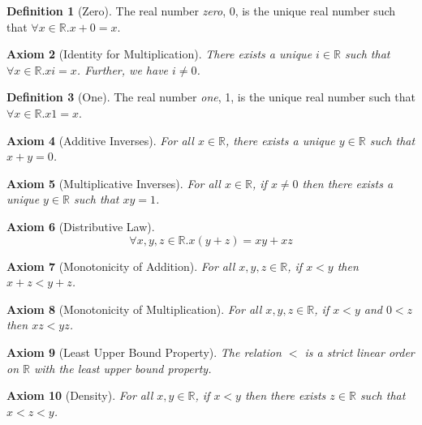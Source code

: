 \documentclass{report}
\newtheorem{ax}{Axiom}[chapter]
\theoremstyle{definition}
\newtheorem{df}[ax]{Definition}
\begin{document}
\begin{df}[Zero]
The real number \emph{zero}, 0, is the unique real number such that $\forall x \in \mathbb{R}. x + 0 = x$.
\end{df}

\begin{ax}[Identity for Multiplication]
There exists a unique $i \in \mathbb{R}$ such that $\forall x \in \mathbb{R}. xi = x$. Further, we have $i \neq 0$.
\end{ax}

\begin{df}[One]
The real number \emph{one}, 1, is the unique real number such that $\forall x \in \mathbb{R}. x 1 = x$.
\end{df}

\begin{ax}[Additive Inverses]
For all $x \in \mathbb{R}$, there exists a unique $y \in \mathbb{R}$ such that $x + y = 0$.
\end{ax}

\begin{ax}[Multiplicative Inverses]
For all $x \in \mathbb{R}$, if $x \neq 0$ then there exists a unique $y \in \mathbb{R}$ such that $xy = 1$.
\end{ax}

\begin{ax}[Distributive Law]
\[ \forall x,y,z \in \mathbb{R}. x(y+z) = xy+xz \]
\end{ax}

\begin{ax}[Monotonicity of Addition]
For all $x,y,z \in \mathbb{R}$, if $x < y$ then $x + z < y + z$.
\end{ax}

\begin{ax}[Monotonicity of Multiplication]
For all $x,y,z \in \mathbb{R}$, if $x < y$ and $0 < z$ then $xz < yz$.
\end{ax}

\begin{ax}[Least Upper Bound Property]
The relation $<$ is a strict linear order on $\mathbb{R}$ with the least upper bound property.
\end{ax}

\begin{ax}[Density]
For all $x,y \in \mathbb{R}$, if $x < y$ then there exists $z \in \mathbb{R}$ such that $x < z < y$.
\end{ax}
\end{document}
